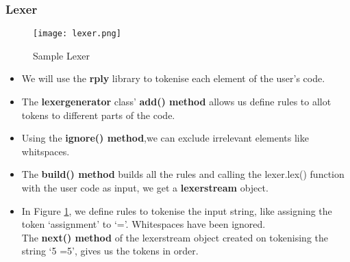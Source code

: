 \documentclass{article}
\begin{document}
\subsubsection{\large{Lexer}}
\begin{center}
\begin{figure}
\texttt{[image: lexer.png]}

\caption{Sample Lexer}
\label{fig:lexer}
\end{figure}
\end{center}
\begin{itemize}
\item We will use the \textbf{rply} library to tokenise each element of the user's code.
\item The \textbf{lexergenerator} class'
\textbf{add() method} allows us define rules to allot tokens to different parts of the code.
\item Using the \textbf{ignore() method},we can exclude irrelevant elements like whitspaces.
\item The \textbf{build() method} builds all the rules and calling the lexer.lex() function with the user code as input, we get a \textbf{lexerstream} object.
\item In Figure \ref{fig:lexer}, we define rules to tokenise the input string, like assigning the token `assignment' to `='. Whitespaces have been ignored. \\The \textbf{next() method} of the lexerstream object created on tokenising the string `5 =5', gives us the tokens in order. %
\end{itemize}
\end{document}
